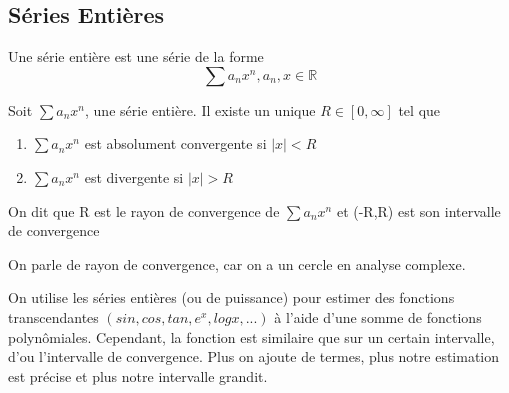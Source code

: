 \documentclass{article}
\begin{document}
\subsection{Séries Entières}

\begin{definition}
    Une série entière est une série de la forme
    $$ \sum a_n x^n, a_n , x \in \mathbb{R}$$
\end{definition}

\begin{theorem}
    Soit $ \sum a_n x^n$, une série entière. Il existe un unique $R \in
    [0, \infty]$ tel que
    \begin{enumerate}
	\item $ \sum a_n x^n$ est absolument convergente si $|x|<R$
	\item $ \sum a_n x^n$ est divergente si $|x|>R$
    \end{enumerate}
    On dit que R est le rayon de convergence de $ \sum a_n x^n$ et (-R,R)
    est son intervalle de convergence
\end{theorem}

\begin{remark}
    On parle de rayon de convergence, car on a un cercle en analyse
    complexe.
\end{remark}

\begin{remark}
    On utilise les séries entières (ou de puissance) pour estimer des
    fonctions transcendantes $(sin, cos, tan, e^x, log x, ...)$ à
    l'aide d'une somme de fonctions polynômiales. Cependant, la fonction
    est similaire que sur un certain intervalle, d'ou l'intervalle de
    convergence. Plus on ajoute de termes, plus notre estimation est
    précise et plus notre intervalle grandit.
\end{remark}

\pagebreak
\end{document}
